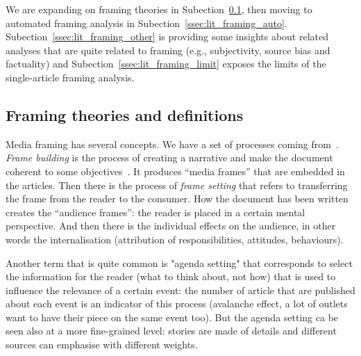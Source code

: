 We are expanding on framing theories in Subection~\ref{ssec:lit_framing_theory}, then moving to automated framing analysis in Subection~\ref{ssec:lit_framing_auto}. Subection~\ref{ssec:lit_framing_other} is providing some insights about related analyses that are quite related to framing (e.g., subjectivity, source bias and factuality) and Subection~\ref{ssec:lit_framing_limit} exposes the limits of the single-article framing analysis.

\subsection{Framing theories and definitions}
\label{ssec:lit_framing_theory}


Media framing has several concepts.
We have a set of processes coming from~\cite{scheufele1999framing}.
\textit{Frame building} is the process of creating a narrative and make the document coherent to some objectives~\cite{TODO}. It produces ``media frames'' that are embedded in the articles.
Then there is the process of \textit{frame setting} that refers to transferring the frame from the reader to the consumer. How the document has been written creates the ``audience frames'': the reader is placed in a certain mental perspective.
And then there is the individual effects on the audience, in other words the internalisation (attribution of responsibilities, attitudes, behaviours).

Another term that is quite common is "agenda setting" that corresponds to select the information for the reader (what to think about, not how) that is used to influence the relevance of a certain event: the number of article that are published about each event is an indicator of this process (avalanche effect, a lot of outlets want to have their piece on the same event too).
But the agenda setting ca be seen also at a more fine-grained level: stories are made of details and different sources can emphasise with different weights.



